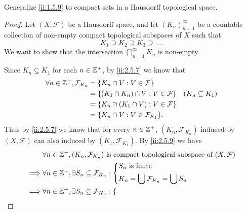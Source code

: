 \begin{ex}\label{ii:ex:2.5.13}
  Generalize \cref{ii:1.5.9} to compact sets in a Hausdorff topological space.
\end{ex}

\begin{proof}
  Let \((X, \mathcal{F})\) be a Hausdorff space, and let \((K_n)_{n = 1}^\infty\) be a countable collection of non-empty compact topological subspaces of \(X\) such that
  \[
    K_1 \supseteq K_2 \supseteq K_3 \supseteq \dots.
  \]
  We want to show that the intersection \(\bigcap_{n = 1}^\infty K_n\) is non-empty.

  Since \(K_n \subseteq K_1\) for each \(n \in \mathbb{Z}^+\), by \cref{ii:2.5.7} we know that
  \begin{align*}
    \forall n \in \Z^+, \mathcal{F}_{K_n} & = \set{K_n \cap V : V \in \mathcal{F}}                                  \\
                                          & = \set{(K_1 \cap K_n) \cap V : V \in \mathcal{F}} & (K_n \subseteq K_1) \\
                                          & = \set{K_n \cap (K_1 \cap V) : V \in \mathcal{F}}                       \\
                                          & = \set{K_n \cap V : V \in \mathcal{F}_{K_1}}.
  \end{align*}
  Thus by \cref{ii:2.5.7} we know that for every \(n \in \mathbb{Z}^+\), \((K_n, \mathcal{F}_{K_n})\) induced by \((X, \mathcal{F})\) can also induced by \((K_1, \mathcal{F}_{K_1})\).
  By \cref{ii:2.5.9} we have
  \begin{align*}
             & \forall n \in \Z^+, (K_n, \mathcal{F}_{K_n}) \text{ is compact topological subspace of } (X, \mathcal{F})                                                               \\
    \implies & \forall n \in \Z^+, \exists S_n \subseteq \mathcal{F}_{K_n} : \begin{dcases}
                                                                               S_n \text{ is finite} \\
                                                                               K_n = \bigcup \mathcal{F}_{K_n} = \bigcup S_n
                                                                             \end{dcases}                                                              \\
    \implies & \forall n \in \Z^+, \exists S_n \subseteq \mathcal{F}_{K_n} : \begin{dcases}

\end{dcases}
\end{align*}
\end{proof}
